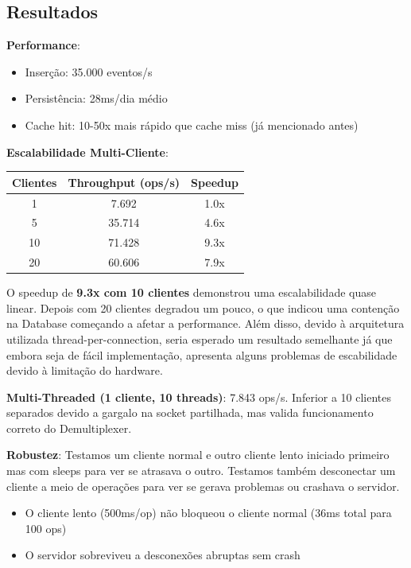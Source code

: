 \documentclass[11pt,a4paper]{article}
\begin{document}
\subsection{Resultados}

\textbf{Performance}:
\begin{itemize}[noitemsep]
    \item Inserção: 35.000 eventos/s
    \item Persistência: 28ms/dia médio
    \item Cache hit: 10-50x mais rápido que cache miss (já mencionado antes)
\end{itemize}

\textbf{Escalabilidade Multi-Cliente}:
\begin{center}
\begin{tabular}{|c|c|c|}
\hline
Clientes & Throughput (ops/s) & Speedup \\
\hline
1 & 7.692 & 1.0x \\
5 & 35.714 & 4.6x \\
10 & 71.428 & 9.3x \\
20 & 60.606 & 7.9x \\
\hline
\end{tabular}
\end{center}

O speedup de \textbf{9.3x com 10 clientes} demonstrou uma escalabilidade quase linear. Depois com 20 clientes degradou um pouco, o que indicou uma contenção na Database começando a afetar a performance.
Além disso, devido à arquitetura utilizada thread-per-connection, seria esperado um resultado semelhante já que embora seja de fácil implementação, apresenta alguns problemas de escabilidade devido à limitação do hardware.

\textbf{Multi-Threaded (1 cliente, 10 threads)}: 7.843 ops/s. Inferior a 10 clientes separados devido a gargalo na socket partilhada, mas valida funcionamento correto do Demultiplexer.

\textbf{Robustez}:
Testamos um cliente normal e outro cliente lento iniciado primeiro mas com sleeps para ver se atrasava o outro. Testamos também desconectar um cliente a meio de operações para ver se gerava problemas ou crashava o servidor.
\begin{itemize}[noitemsep]
    \item O cliente lento (500ms/op) não bloqueou o cliente normal (36ms total para 100 ops)
    \item O servidor sobreviveu a desconexões abruptas sem crash
\end{itemize}
\end{document}
